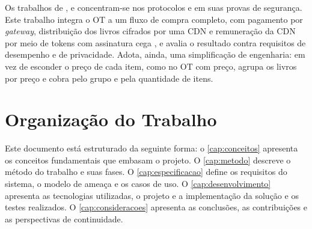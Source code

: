 Os trabalhos de ,  e
 concentram-se nos protocolos e em suas provas de
segurança. Este trabalho integra o OT a um fluxo de compra completo, com
pagamento por \emph{gateway}, distribuição dos livros cifrados por uma CDN e
remuneração da CDN por meio de tokens com assinatura cega \cite{chaum1983}, e
avalia o resultado contra requisitos de desempenho e de privacidade. Adota,
ainda, uma simplificação de engenharia: em vez de esconder o preço de cada
item, como no OT com preço, agrupa os livros por preço e cobra pelo grupo e
pela quantidade de itens.

\section{Organização do Trabalho}

Este documento está estruturado da seguinte forma: o \autoref{cap:conceitos}
apresenta os conceitos fundamentais que embasam o projeto. O
\autoref{cap:metodo} descreve o método do trabalho e suas fases. O
\autoref{cap:especificacao} define os requisitos do sistema, o modelo de
ameaça e os casos de uso. O \autoref{cap:desenvolvimento} apresenta as
tecnologias utilizadas, o projeto e a implementação da solução e os testes
realizados. O \autoref{cap:consideracoes} apresenta as conclusões, as
contribuições e as perspectivas de continuidade.

